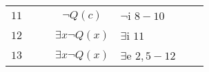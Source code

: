 \documentclass[12pt]{article}
\begin{document}
\begin{table}[H]
\begin{tabular}{lllclll}
	    $11$ &\multicolumn{1}{c}{}  & \multicolumn{1}{|c}{} & $\neg Q(c)$ &$\neg$i $8-10$ & \multicolumn{1}{l|}{} & \multicolumn{1}{c}{} \\ 
	    
	    $12$ &\multicolumn{1}{c}{}  & \multicolumn{1}{|c}{} & $\exists x \neg Q(x)$ &$\exists$i $11$ & \multicolumn{1}{l|}{} & \multicolumn{1}{c}{} \\ \cline{3-6}
	    
	    $13$ &\multicolumn{1}{c}{}  &  & $\exists x \neg Q(x)$ &$\exists$e $2,5-12$ &  & \multicolumn{1}{c}{} \\ %
	
	\end{tabular}
\end{table}
\end{document}
